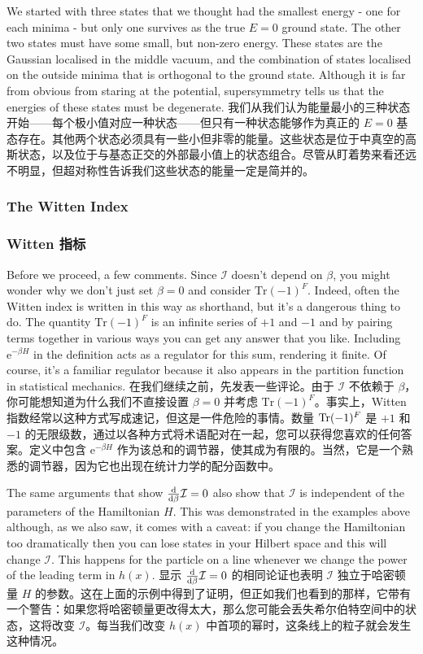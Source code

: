 \documentclass{ctexart}
\newcommand{\rme}{\mathrm{e}}
\begin{document}
\begin{paracol}{2}
We started with three states that we thought had the smallest energy - one for each minima - but only one survives as the true $E = 0$ ground state. The other two states must have some small, but non-zero energy. These states are the Gaussian localised in the middle vacuum, and the combination of states localised on the outside minima that is orthogonal to the ground state. Although it is far from obvious from staring at the potential, supersymmetry tells us that the energies of these states must be degenerate.
\switchcolumn
我们从我们认为能量最小的三种状态开始——每个极小值对应一种状态——但只有一种状态能够作为真正的 $E = 0$ 基态存在。其他两个状态必须具有一些小但非零的能量。这些状态是位于中真空的高斯状态，以及位于与基态正交的外部最小值上的状态组合。尽管从盯着势来看还远不明显，但超对称性告诉我们这些状态的能量一定是简并的。
\switchcolumn*

\subsubsection{The Witten Index}
\switchcolumn
\subsubsection*{Witten 指标}
\switchcolumn*

Before we proceed, a few comments. Since $\mathcal{I}$ doesn't depend on $\beta$, you might wonder why we don't just set $\beta = 0$ and consider $\mathrm{Tr} (-1)^F$. Indeed, often the Witten index is written in this way as shorthand, but it's a dangerous thing to do. The quantity $\mathrm{Tr} (-1)^F$ is an infinite series of $+ 1$ and $- 1$ and by pairing terms together in various ways you can get any answer that you like. Including $\rme^{- \beta H}$ in the definition acts as a regulator for this sum, rendering it finite. Of course, it's a familiar regulator because it also appears in the partition function in statistical mechanics.
\switchcolumn
在我们继续之前，先发表一些评论。由于 $\mathcal{I}$ 不依赖于 $\beta$，你可能想知道为什么我们不直接设置 $\beta = 0$ 并考虑 $\mathrm{Tr} (-1)^F$。事实上，Witten 指数经常以这种方式写成速记，但这是一件危险的事情。数量 $\operatorname{Tr} (-1)^F$ 是 $+ 1$ 和 $- 1$ 的无限级数，通过以各种方式将术语配对在一起，您可以获得您喜欢的任何答案。定义中包含 $\rme^{- \beta H}$ 作为该总和的调节器，使其成为有限的。当然，它是一个熟悉的调节器，因为它也出现在统计力学的配分函数中。
\switchcolumn*

The same arguments that show $\odv*{\mathcal{I}}{\beta} = 0$ also show that $\mathcal{I}$ is independent of the parameters of the Hamiltonian $H$. This was demonstrated in the examples above although, as we also saw, it comes with a caveat: if you change the Hamiltonian too dramatically then you can lose states in your Hilbert space and this will change $\mathcal{I}$. This happens for the particle on a line whenever we change the power of the leading term in $h(x)$.
\switchcolumn
显示 $\odv*{\mathcal{I}}{\beta} = 0$ 的相同论证也表明 $\mathcal{I}$ 独立于哈密顿量 $H$ 的参数。这在上面的示例中得到了证明，但正如我们也看到的那样，它带有一个警告：如果您将哈密顿量更改得太大，那么您可能会丢失希尔伯特空间中的状态，这将改变 $\mathcal{I}$。每当我们改变 $h(x)$ 中首项的幂时，这条线上的粒子就会发生这种情况。
\switchcolumn*


\end{paracol}
\end{document}
